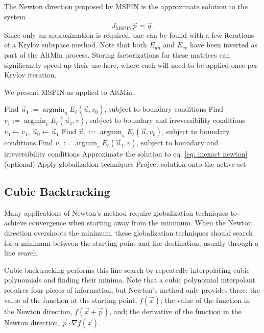 \documentclass{article}
\DeclareMathOperator{\argmin}{argmin}
\DeclareMathOperator{\mspin}{MSPIN}
\numberwithin{equation}{section}
\begin{document}
The Newton direction proposed by MSPIN is the approximate solution to the system
\begin{equation} \label{eq: inexact newton}
	J_{\mspin} \vec{p} = \vec{q}.
\end{equation}
Since only an approximation is required, one can be found with a few iterations of a Krylov subspace method.
Note that both $E_{uu}$ and $E_{vv}$ have been inverted as part of the AltMin process.
Storing factorizations for these matrices can significantly speed up their use here, where each will need to be applied once per Krylov iteration.

We present MSPIN as applied to AltMin.
\begin{algorithm}
	\caption{MSPIN on AltMin \\
		$\vec{u}_0$: initial displacement, $v_0$: initial damage, $\tau$: tolerance}
	\begin{algorithmic}[1]
	\State Find $\vec{u}_1 := \argmin_u E_\ell(\vec{u}, v_0)$, subject to boundary conditions
	\State Find $v_1 := \argmin_v E_\ell(\vec{u}_1, v)$, subject to boundary and irreversibility conditions
		\State $v_0 \gets v_1$, $\vec{u}_0 \gets \vec{u}_1$
		\State Find $\vec{u}_1 := \argmin_u E_\ell(\vec{u}, v_0)$, subject to boundary conditions
		\State Find $v_1 := \argmin_v E_\ell(\vec{u}_1, v)$, subject to boundary and irreversibility conditions
		\State Approximate the solution to eq. \eqref{eq: inexact newton}
		\State (optional) Apply globalization techniques
		\State Project solution onto the active set
	\EndWhile
	\end{algorithmic}
	\label{alg: mspin}
\end{algorithm}

\subsection{Cubic Backtracking}
\label{subsec: cb}

Many applications of Newton's method require globalization techniques to achieve convergence when starting away from the minimum.
When the Newton direction overshoots the minimum, these globalization techniques should search for a minimum between the starting point and the destination, usually through a line search.

Cubic backtracking \cite{dennis1996numerical} performs this line search by repeatedly interpolating cubic polynomials and finding their minima.
Note that a cubic polynomial interpolant requires four pieces of information, but Newton's method only provides three:
the value of the function at the starting point, $f(\vec{x})$;
the value of the function in the Newton direction, $f(\vec{x} + \vec{p})$, and;
the derivative of the function in the Newton direction, $\vec{p} \cdot \nabla f(\vec{x})$.
\end{document}

